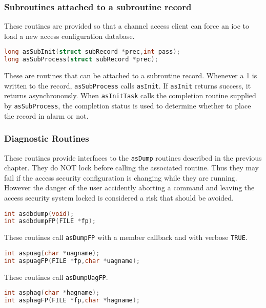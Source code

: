 \subsubsection{Subroutines attached to a subroutine record}

These routines are provided so that a channel access client can force an ioc to load a new access configuration database.

\begin{lstlisting}[language=C]
long asSubInit(struct subRecord *prec,int pass);
long asSubProcess(struct subRecord *prec);
\end{lstlisting}

These are routines that can be attached to a subroutine record.
Whenever a 1 is written to the record, \verb|asSubProcess| calls \verb|asInit|.
If \verb|asInit| returns success, it returns asynchronously.
When \verb|asInitTask| calls the completion routine supplied by \verb|asSubProcess|, the completion status is used to determine whether to place the record in alarm or not.

\subsubsection{Diagnostic Routines}

These routines provide interfaces to the \verb|asDump| routines described in the previous chapter.
They do NOT lock before calling the associated routine.
Thus they may fail if the access security configuration is changing while they are running.
However the danger of the user accidently aborting a command and leaving the access security system locked is considered a risk that should be avoided.

\begin{lstlisting}[language=C]
int asdbdump(void);
int asdbdumpFP(FILE *fp);
\end{lstlisting}

These routines call \verb|asDumpFP| with a member callback and with verbose \verb|TRUE|.

\begin{lstlisting}[language=C]
int aspuag(char *uagname);
int aspuagFP(FILE *fp,char *uagname);
\end{lstlisting}

These routines call \verb|asDumpUagFP|.

\begin{lstlisting}[language=C]
int asphag(char *hagname);
int asphagFP(FILE *fp,char *hagname);
\end{lstlisting}

